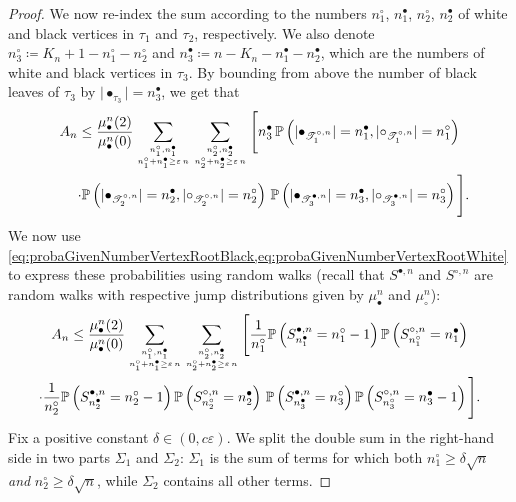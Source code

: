 \documentclass[AHL,XML,longabstracts,Unicode]{cedram}
\providecommand{\abs}[1]{\lvert#1\rvert}
\def\eps{\varepsilon}
\def\mubn{\mu_{\bullet}^{n}}
\def\mucn{\mu_{\circ}^{n}}
\def\Sbn{S^{\bullet,n}}
\def\Scn{S^{\circ,n}}
\def\Ts{\mathscr{T}}
\renewcommand\Pr[1]{\mathbb{P}\left(#1\right)}
\begin{document}
\begin{proof}
  We now re-index  the sum according to the numbers $n^\circ_1$, $n^\bullet_1$, $n^\circ_2$, $n^\bullet_2$
  of white and black vertices in $\tau_{1}$ and $\tau_{2}$, respectively.
  We also denote $n^\circ_3\coloneqq K_n+1-n^\circ_1-n^\circ_2$
  and $n^\bullet_3\coloneqq n-K_n-n^\bullet_1-n^\bullet_2$, which are the numbers of
  white and black vertices in $\tau_{3}$. By bounding from above the number of black leaves of $\tau_{3}$ by $\abs{\bullet_{\tau_{3}}}=n^\bullet_3$, we get that
  \begin{multline*}
A_{n} \le \frac{\mubn(2)}{\mubn(0)}
   \sum_{n^\circ_1, n^\bullet_1 \atop n^\circ_1 + n^\bullet_1 \geq \eps\, n}
   \sum_{n^\circ_2, n^\bullet_2 \atop n^\circ_2 + n^\bullet_2 \geq \eps\, n}
 \Bigg[ n^\bullet_3 \, \Pr{\abs{\bullet_{\Ts^{\circ,n}_{1}}}= n^\bullet_1, \abs{\circ_{\Ts^{\circ,n}_{1}}}= n^\circ_1} \\
  \qquad \cdot \Pr{\abs{\bullet_{\Ts^{\circ,n}_{2}}}= n^\bullet_2, \abs{\circ_{\Ts^{\circ,n}_{2}}}= n^\circ_2} \,
  \Pr{\abs{\bullet_{\Ts^{\bullet,n}_{3}}}= n^\bullet_3, \abs{\circ_{\Ts^{\bullet,n}_{3}}}= n^\circ_3} \Bigg].
  \end{multline*}
  We now use \cref{eq:probaGivenNumberVertexRootBlack,eq:probaGivenNumberVertexRootWhite}
to express these probabilities using random walks
(recall that $\Sbn$ and $\Scn$ are random walks with respective jump distributions given by $\mubn$ and $\mucn$):
  \begin{multline*}
   A_{n} \le \frac{\mubn(2)}{\mubn(0)}
   \sum_{n^\circ_1, n^\bullet_1 \atop n^\circ_1 + n^\bullet_1 \geq \eps\, n}
   \sum_{n^\circ_2, n^\bullet_2 \atop n^\circ_2 + n^\bullet_2 \geq \eps\, n}
   \Bigg[ \frac{1}{n^\circ_1} \Pr{\Sbn_{n^\bullet_1}=n^\circ_1-1} \Pr{\Scn_{n^\circ_1}=n^\bullet_1}  \\
   \cdot \frac{1}{n^\circ_2} \Pr{\Sbn_{n^\bullet_2}=n^\circ_2-1} \Pr{\Scn_{n^\circ_2}=n^\bullet_2}  \,
   \Pr{\Sbn_{n^\bullet_3}=n^\circ_3} \Pr{\Scn_{n^\circ_3}=n^\bullet_3-1} \Bigg].
  \end{multline*}
  Fix a positive constant $\delta \in (0,c \eps)$.
  We split the double sum in the right-hand side in two parts $\varSigma_1$ and $\varSigma_2$:
  $\varSigma_1$ is the sum of terms for which both $n^\circ_1 \ge \delta \sqrt{n}$ {\em and}
  $n^\circ_2 \ge \delta \sqrt{n}$,
  while $\varSigma_2$ contains all other terms.


\end{proof}
\end{document}
